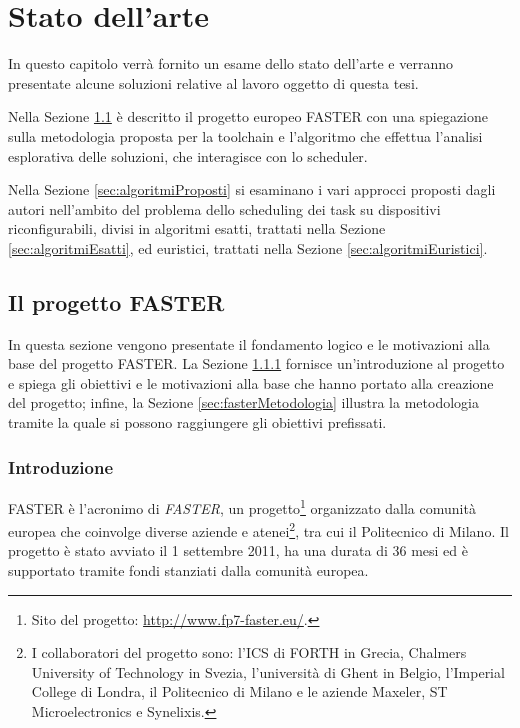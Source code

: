 \chapter{Stato dell'arte}
\label{chap:SOA}
\vspace{1cm}
In questo capitolo verrà fornito un esame dello stato dell'arte e verranno presentate 
alcune soluzioni relative al lavoro oggetto di questa tesi.

Nella Sezione \ref{sec:progettoFASTER} è descritto il progetto europeo 
\acs{FASTER} con una spiegazione sulla metodologia proposta per la toolchain e 
l'algoritmo che effettua l'analisi esplorativa delle soluzioni, che interagisce 
con lo scheduler.

Nella Sezione \ref{sec:algoritmiProposti} si esaminano i vari approcci proposti 
dagli autori nell'ambito del problema dello scheduling dei task su dispositivi 
riconfigurabili, divisi in algoritmi esatti, trattati nella Sezione 
\ref{sec:algoritmiEsatti}, ed euristici, trattati nella Sezione 
\ref{sec:algoritmiEuristici}.


\section[Il progetto \acs{FASTER}]{Il progetto \acs{FASTER}}
\label{sec:progettoFASTER}
In questa sezione vengono presentate il fondamento logico e le motivazioni alla 
base del progetto \acs{FASTER}. La Sezione \ref{sec:fasterIntro} fornisce 
un'introduzione al progetto e spiega gli obiettivi e le motivazioni alla 
base che hanno portato alla creazione del progetto; infine, la Sezione 
\ref{sec:fasterMetodologia} illustra la metodologia tramite la quale si possono 
raggiungere gli obiettivi prefissati.




\subsection{Introduzione}
\label{sec:fasterIntro}
\acs{FASTER} è l'acronimo di \emph{\acl{FASTER}}, un progetto\footnote{Sito del 
progetto: \url{http://www.fp7-faster.eu/}.} organizzato dalla comunità europea 
che coinvolge diverse aziende e atenei\footnote{I collaboratori del progetto 
sono: l'\ac{ICS} di \ac{FORTH} in Grecia, Chalmers University of Technology in 
Svezia, l'università di Ghent in Belgio, l'Imperial College di Londra, il 
Politecnico di Milano e le aziende Maxeler, ST Microelectronics e Synelixis.}, 
tra cui il Politecnico di Milano. Il progetto è stato avviato il 1 settembre 
2011, ha una durata di 36 mesi ed è supportato tramite fondi stanziati dalla 
comunità europea.

